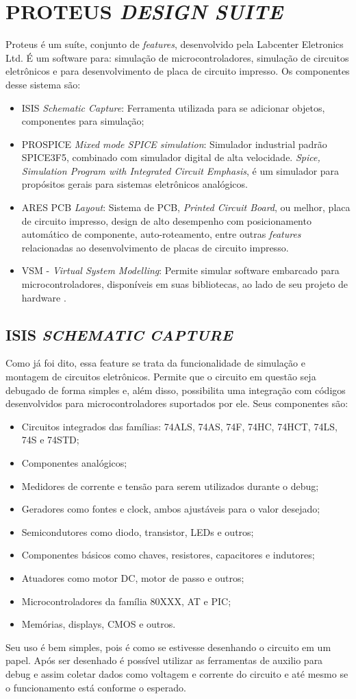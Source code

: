 \section{PROTEUS \emph{DESIGN SUITE}}
Proteus é um suíte, conjunto de \emph{features}, desenvolvido pela Labcenter Eletronics Ltd. É um software para: simulação de microcontroladores, simulação de circuitos eletrônicos e para desenvolvimento de placa de circuito impresso. Os componentes desse sistema são:
\begin{itemize}
\item ISIS \emph{Schematic Capture}: Ferramenta utilizada para se adicionar objetos, componentes para simulação;
\item PROSPICE \emph{Mixed mode SPICE simulation}: Simulador industrial padrão SPICE3F5, combinado com simulador digital de alta velocidade. \emph{Spice, Simulation Program with Integrated Circuit Emphasis}, é um simulador para propósitos gerais para sistemas eletrônicos analógicos.
\item ARES PCB \emph{Layout}: Sistema de PCB, \emph{Printed Circuit Board}, ou melhor, placa de circuito impresso, design de alto desempenho com posicionamento automático de componente, auto-roteamento, entre outras \emph{features} relacionadas ao desenvolvimento de placas de circuito impresso.
\item VSM - \emph{Virtual System Modelling}: Permite simular software embarcado para microcontroladores, disponíveis em suas bibliotecas, ao lado de seu projeto de hardware \cite{proteus2013, wikipedia2012spice}.
\end{itemize}

\subsection{ISIS \emph{SCHEMATIC CAPTURE}}
Como já foi dito, essa feature se trata da funcionalidade de simulação e montagem de circuitos eletrônicos. Permite que o circuito em questão seja debugado de forma simples e, além disso, possibilita uma integração com códigos desenvolvidos para microcontroladores suportados por ele. Seus componentes são:

\begin{itemize}
\item Circuitos integrados das famílias: 74ALS, 74AS, 74F, 74HC, 74HCT, 74LS, 74S e 74STD;
\item Componentes analógicos;
\item Medidores de corrente e tensão para serem utilizados durante o debug;
\item Geradores como fontes e clock, ambos ajustáveis para o valor desejado;
\item Semicondutores como diodo, transistor, LEDs e outros;
\item Componentes básicos como chaves, resistores, capacitores e indutores;
\item Atuadores como motor DC, motor de passo e outros;
\item Microcontroladores da família 80XXX, AT e PIC;
\item Memórias, displays, CMOS e outros.
\end{itemize}

Seu uso é bem simples, pois é como se estivesse desenhando o circuito em um papel. Após ser desenhado é possível utilizar as ferramentas de auxilio para debug e assim coletar dados como voltagem e corrente do circuito e até mesmo se o funcionamento está conforme o esperado.